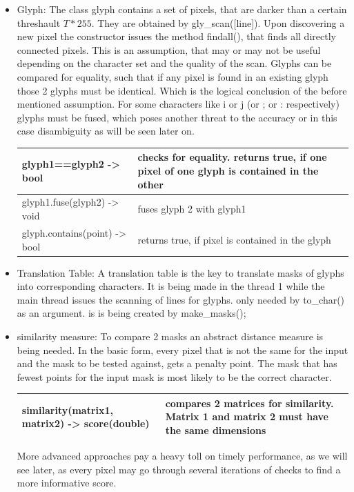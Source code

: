 \documentclass[12pt]{scrartcl}
\begin{document}
\begin{itemize}
\item Glyph: The class glyph contains a set of pixels, that are darker than a certain threshault $T*255$. They are obtained by gly\_scan([line]). Upon discovering a new pixel the constructor issues the method findall(), that finds all directly connected pixels. This is an assumption, that may or may not be useful depending on the character set and the quality of the scan.\newline
Glyphs can be compared for equality, such that if any pixel is found in an existing glyph those 2 glyphs must be identical. Which is the logical conclusion of the before mentioned assumption.\newline
For some characters like i or j (or ; or : respectively) glyphs must be fused, which poses another threat to the accuracy or in this case disambiguity as will be seen later on.\newline
\begin{tabular}{ m{6cm} m{7cm} }
\hline
glyph1==glyph2 -> bool & checks for equality. returns true, if one pixel of one glyph is contained in the other\\
\hline
glyph1.fuse(glyph2) -> void & fuses glyph 2 with glyph1\\ 
\hline
glyph.contains(point) -> bool & returns true, if pixel is contained in the glyph\\
\hline
\end{tabular}
\vspace{1cm}


\item Translation Table: A translation table is the key to translate masks of glyphs into corresponding characters. It is being made in the thread 1 while the main thread issues the scanning of lines for glyphs.\newline
only needed by to\_char() as an argument. is is being created by make\_masks();
\vspace{1cm}

\item similarity measure: To compare 2 masks an abstract distance measure is being needed. In the basic form, every pixel that is not the same for the input and the mask to be tested against, gets a penalty point. The mask that has fewest points for the input mask is most likely to be the correct character.\newline
\begin{tabular}{ m{6cm} m{7cm} }
\hline
similarity(matrix1, matrix2) -> score(double) & compares 2 matrices for similarity. Matrix 1 and matrix 2 must have the same dimensions\\
\hline
\end{tabular}
\vspace{1cm}

More advanced approaches pay a heavy toll on timely performance, as we will see later, as every pixel may go through several iterations of checks to find a more informative score.\newline

\end{itemize}
\end{document}
